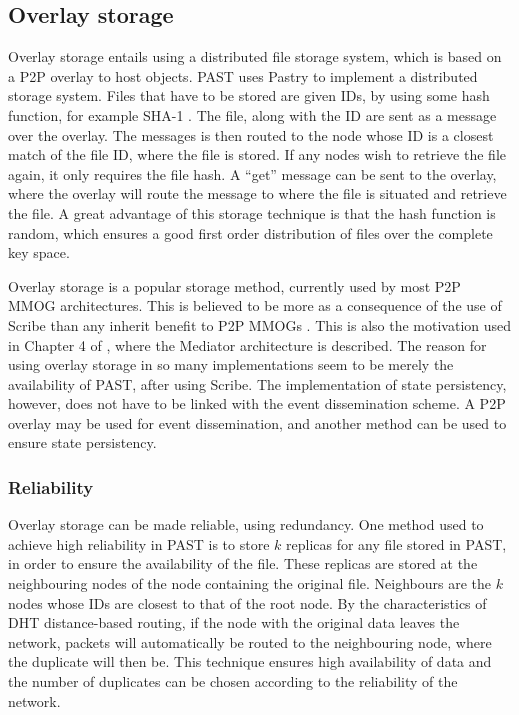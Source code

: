 \documentclass[10pt,a4paper,journal,cspaper,compsoc]{IEEEtran}
\begin{document}
\subsection{Overlay storage}
\label{overlay_storage}

Overlay storage entails using a distributed file storage system, which is based on a P2P overlay to host objects. PAST \cite{PAST_storage} uses
Pastry to implement a distributed storage system. Files that have to be stored are given IDs, by using some hash function, for example SHA-1
\cite{SHA}. The file, along with the ID are sent as a message over the overlay. The messages is then routed to the node whose ID is a closest match
of the file ID, where the file is stored. If any nodes wish to retrieve the file again, it only requires the file hash. A ``get'' message can be sent
to the overlay, where the overlay will route the message to where the file is situated and retrieve the file. A great advantage of this storage
technique is that the hash function is random, which ensures a good first order distribution of files over the complete key space.


Overlay storage is a popular storage method, currently used by most P2P MMOG architectures. This is believed to be more as a consequence of the use
of Scribe than any inherit benefit to P2P MMOGs \cite{past_storage_focus}. This is also the motivation used in Chapter 4 of \cite{Fan_phd}, where the
Mediator architecture is described. The reason for using overlay storage in so many implementations seem to be merely the availability of PAST, after
using Scribe. The implementation of state persistency, however, does not have to be linked with the event dissemination scheme. A P2P overlay may be
used for event dissemination, and another method can be used to ensure state persistency.

\subsubsection{Reliability}
\label{overlay_storage_reliability}

Overlay storage can be made reliable, using redundancy. One method used to achieve high reliability in PAST is to store $k$ replicas for any file
stored in PAST, in order to ensure the availability of the file. These replicas are stored at the neighbouring nodes of the node containing the
original file. Neighbours are the $k$ nodes whose IDs are closest to that of the root node. By the characteristics of \ac{DHT} distance-based
routing, if the node with the original data leaves the network, packets will automatically be routed to the neighbouring node, where the duplicate
will then be. This technique ensures high availability of data and the number of duplicates can be chosen according to the reliability of the
network.
\end{document}
